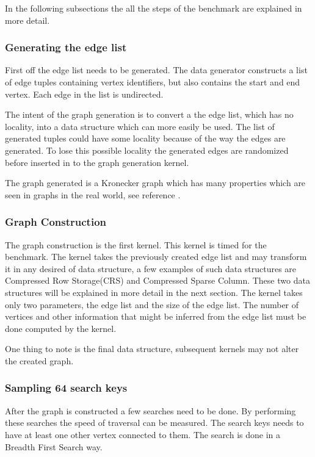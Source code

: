 In the following subsections the all the steps of the benchmark are explained in more detail.

\subsubsection{Generating the edge list}
First off the edge list needs to be generated. 
The data generator constructs a list of edge tuples containing vertex identifiers, but also contains the start and end vertex. Each edge in the list is undirected.

The intent of the graph generation is to convert a the edge list, which has no locality, into a data structure which can more easily be used. The list of generated tuples could have some locality because of the way the edges are generated. To lose this possible locality the generated edges are randomized before inserted in to the graph generation kernel. 

The graph generated is a Kronecker graph which has many properties which are seen in graphs in the real world, see reference \cite{leskovec2010kronecker}.

\subsubsection{Graph Construction}
The graph construction is the first kernel. This kernel is timed for the benchmark. The kernel takes the previously created edge list and may transform it in any desired of data structure, a few examples of such data structures are Compressed Row Storage(CRS) and Compressed Sparse Column. These two data structures will be explained in more detail in the next section. The kernel takes only two parameters, the edge list and the size of the edge list. The number of vertices and other information that might be inferred from the edge list must be done computed by the kernel. 

One thing to note is the final data structure, subsequent kernels may not alter the created graph. 

\subsubsection{Sampling 64 search keys}
After the graph is constructed a few searches need to be done. By performing these searches the speed of traversal can be measured. The search keys needs to have at least one other vertex connected to them. The search is done in a Breadth First Search way.

